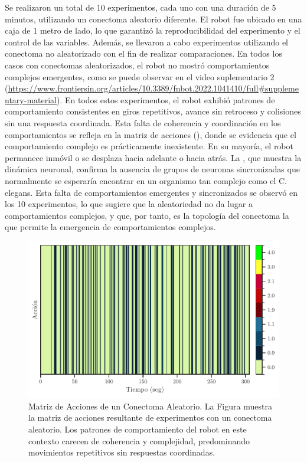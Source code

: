 Se realizaron un total de 10 experimentos, cada uno con una duración de 5 minutos, utilizando un conectoma aleatorio diferente. El robot fue ubicado en una caja de 1 metro de lado, lo que garantizó la reproducibilidad del experimento y el control de las variables. Además, se llevaron a cabo experimentos utilizando el conectoma no aleatorizado con el fin de realizar comparaciones. En todos los casos con conectomas aleatorizados, el robot no mostró comportamientos complejos emergentes, como se puede observar en el video suplementario 2 (\url{https://www.frontiersin.org/articles/10.3389/fnbot.2022.1041410/full#supplementary-material}). En todos estos experimentos, el robot exhibió patrones de comportamiento consistentes en giros repetitivos, avance sin retroceso y colisiones sin una respuesta coordinada. Esta falta de coherencia y coordinación en los comportamientos se refleja en la matriz de acciones (), donde se evidencia que el comportamiento complejo es prácticamente inexistente. En su mayoría, el robot permanece inmóvil o se desplaza hacia adelante o hacia atrás. La , que muestra la dinámica neuronal, confirma la ausencia de grupos de neuronas sincronizadas que normalmente se esperaría encontrar en un organismo tan complejo como el C. elegans. Esta falta de comportamientos emergentes y sincronizados se observó en los 10 experimentos, lo que sugiere que la aleatoriedad no da lugar a comportamientos complejos, y que, por tanto, es la topología del conectoma la que permite la emergencia de comportamientos complejos.

\begin{figure}[h!]
	\centering\includegraphics[width=\imsize]{accion_aleatorio.pdf}
	\caption[ Matriz de Acciones de un Conectoma Aleatorio.]{ Matriz de Acciones de un Conectoma Aleatorio. La Figura  muestra la matriz de acciones resultante de experimentos con un conectoma aleatorio. Los patrones de comportamiento del robot en este contexto carecen de coherencia y complejidad, predominando movimientos repetitivos sin respuestas coordinadas.  }\label{fig:comportamiento_aleatorio}
\end{figure}


